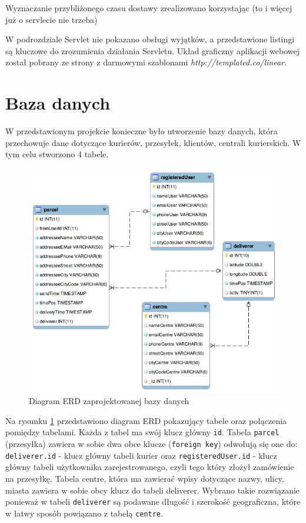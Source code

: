 \documentclass[eng,printmode,oneside]{mgr}
\begin{document}
Wyznaczanie przybliżonego czasu dostawy zrealizowano korzystając (to i więcej już
o servlecie nie trzeba)

W podrozdziale Servlet nie pokazano obsługi wyjątków, a przedstawione listingi
są kluczowe do zrozumienia działania Servletu. Układ graficzny aplikacji webowej
został pobrany ze strony z darmowymi szablonami
{\textit{http://templated.co/linear}}.

\section{Baza danych}

W przedstawionym projekcie konieczne było utworzenie bazy danych, która
przechowuje dane dotyczące kurierów, przesyłek, klientów, centrali kurierskich.
W tym celu stworzono 4 tabele. 

\begin{figure}[ht!]
\centering
\includegraphics[width=70ex]{ERD.png}
\caption{Diagram ERD zaprojektowanej bazy danych}
\label{ERD}
\end{figure}

Na rysunku \ref{ERD} przedstawiono diagram ERD pokazujący tabele oraz połączenia
pomiędzy tabelami. Każda z tabel ma swój klucz główny \texttt{id}. Tabela
\texttt{parcel} (przesyłka) zawiera w sobie dwa obce klucze (\texttt{foreign
key}) odwołują się one do: \texttt{deliverer.id} - klucz główny
tabeli kurier oraz \texttt{registeredUser.id} - klucz główny tabeli użytkownika zarejestrowanego,
czyli tego który złożył zamówienie na przesyłkę. Tabela centre, która ma
zawierać wpisy dotyczące nazwy, ulicy, miasta zawiera w sobie obcy klucz do
tabeli deliverer. Wybrano takie rozwiązanie ponieważ w tabeli \texttt{deliverer}
są podawane długość i szerokość geograficzna, które w łatwy sposób powiązano z
tabelą \texttt{centre}.
\end{document}
